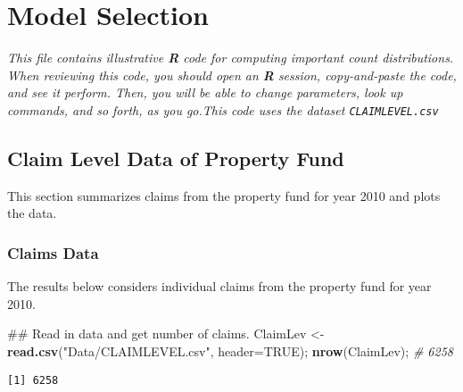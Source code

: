 \documentclass[]{book}
\newenvironment{Shaded}{\begin{snugshade}}{\end{snugshade}}
\newcommand{\KeywordTok}[1]{\textcolor[rgb]{0.13,0.29,0.53}{\textbf{#1}}}
\newcommand{\DataTypeTok}[1]{\textcolor[rgb]{0.13,0.29,0.53}{#1}}
\newcommand{\DecValTok}[1]{\textcolor[rgb]{0.00,0.00,0.81}{#1}}
\newcommand{\StringTok}[1]{\textcolor[rgb]{0.31,0.60,0.02}{#1}}
\newcommand{\CommentTok}[1]{\textcolor[rgb]{0.56,0.35,0.01}{\textit{#1}}}
\newcommand{\OtherTok}[1]{\textcolor[rgb]{0.56,0.35,0.01}{#1}}
\newcommand{\OperatorTok}[1]{\textcolor[rgb]{0.81,0.36,0.00}{\textbf{#1}}}
\newcommand{\NormalTok}[1]{#1}
\theoremstyle{definition}
\theoremstyle{definition}
\theoremstyle{definition}
\theoremstyle{remark}
\begin{document}
\chapter{Model Selection}\label{model-selection}

\emph{This file contains illustrative \textbf{R} code for computing
important count distributions. When reviewing this code, you should open
an \textbf{R} session, copy-and-paste the code, and see it perform.
Then, you will be able to change parameters, look up commands, and so
forth, as you go.This code uses the dataset \texttt{CLAIMLEVEL.csv} }

\section{Claim Level Data of Property
Fund}\label{claim-level-data-of-property-fund}

This section summarizes claims from the property fund for year 2010 and
plots the data.

\subsection{Claims Data}\label{claims-data}

The results below considers individual claims from the property fund for
year 2010.

\begin{Shaded}
\begin{Highlighting}[]
\NormalTok{## Read in data and get number of claims.  }
\NormalTok{ClaimLev <-}\StringTok{ }\KeywordTok{read.csv}\NormalTok{(}\StringTok{"Data/CLAIMLEVEL.csv"}\NormalTok{, }\DataTypeTok{header=}\OtherTok{TRUE}\NormalTok{); }\KeywordTok{nrow}\NormalTok{(ClaimLev); }\CommentTok{# 6258}
\end{Highlighting}
\end{Shaded}

\begin{verbatim}
[1] 6258
\end{verbatim}

\begin{Shaded}
\end{Shaded}
\end{document}
